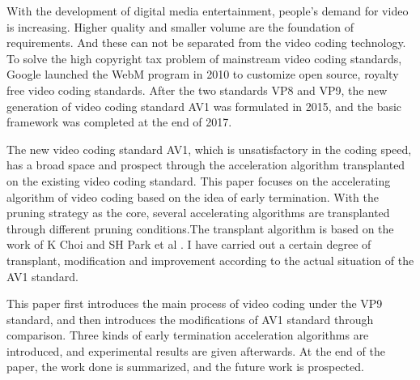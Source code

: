 
\begin{eabstract}
  With the development of digital media entertainment, people's demand for video is increasing. 
  Higher quality and smaller volume are the foundation of requirements. And these can not be 
  separated from the video coding technology. To solve the high copyright tax problem of mainstream 
  video coding standards, Google launched the WebM program in 2010 to customize open source, royalty 
  free video coding standards. After the two standards VP8 and VP9, the new generation of video coding 
  standard AV1 was formulated in 2015, and the basic framework was completed at the end of 2017.

  The new video coding standard AV1, which is unsatisfactory in the coding speed, has a broad space 
  and prospect through the acceleration algorithm transplanted on the existing video coding standard.
  This paper focuses on the accelerating algorithm of video coding based on the idea of early termination. 
  With the pruning strategy as the core, several accelerating algorithms are transplanted through 
  different pruning conditions.The transplant algorithm is based on the work of K Choi and 
  SH Park et al \cite{choi2011coding}. I have carried out a certain degree of transplant, 
  modification and improvement according to the actual situation of the AV1 standard.
  
  This paper first introduces the main process of video coding under the VP9 standard, and then 
  introduces the modifications of AV1 standard through comparison. Three kinds of early termination 
  acceleration algorithms are introduced, and experimental results are given afterwards. 
  At the end of the paper, the work done is summarized, and the future work is prospected.

\end{eabstract}

